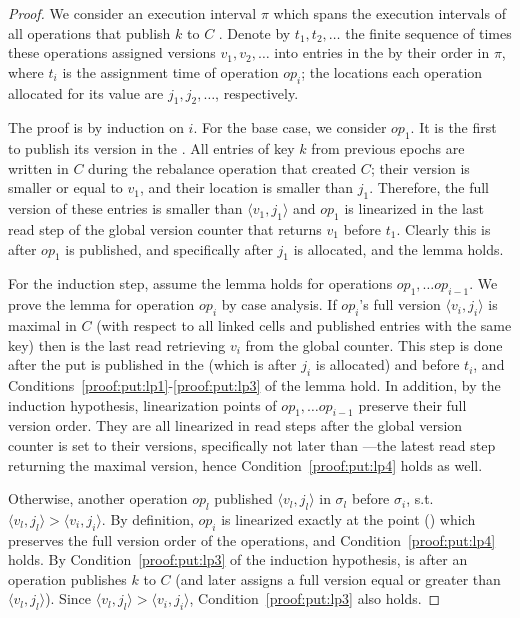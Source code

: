 \begin{proof}
We consider an execution interval $\pi$ which spans the execution intervals of all operations that publish $k$ to $C$ .
Denote by $t_1, t_2, \ldots $ the finite sequence of times these operations assigned versions $v_1, v_2, \ldots$ into entries in the  by their order in $\pi$, where $t_i$ is the assignment time of operation $op_i$; the locations each operation allocated for its value are $j_1, j_2, \ldots$, respectively.

The proof is by induction on $i$. For the base case, we consider $op_1$. It is the first to publish its version in the . 
All entries of key $k$ from previous epochs are written in $C$ during the rebalance operation that created $C$; their version is smaller or equal to $v_1$, and their location is smaller than $j_1$. 
Therefore, the full version of these entries is smaller than $\langle v_1, j_1\rangle$  and $op_1$ is linearized in the last read step of the global version counter that returns $v_1$ before $t_1$. Clearly this is after $op_1$ is published, and specifically after $j_1$ is allocated, and the lemma holds.

For the induction step, assume the lemma holds for operations $op_1, \ldots op_{i-1}$. We prove the lemma for operation $op_i$ by case analysis.
If $op_i$'s full version $\langle v_i, j_i\rangle$ is maximal in $C$ (with respect to all linked cells and published entries with the same key) then  is the last read retrieving $v_i$ from the global counter. This step is done after the put is published in the  (which is after $j_i$ is allocated) and before $t_i$, and Conditions~\ref{proof:put:lp1}-\ref{proof:put:lp3} of the lemma hold. In addition, by the induction hypothesis, linearization points of $op_1, \ldots op_{i-1}$ preserve their full version order. They are all linearized in read steps after the global version counter is set to their versions, specifically not later than ---the latest read step returning the maximal version, hence Condition~\ref{proof:put:lp4} holds as well.

Otherwise, another operation $op_l$ published $\langle v_l, j_l\rangle$ in $\sigma_l$ before $\sigma_i$, s.t. $\langle v_l, j_l\rangle > \langle v_i, j_i\rangle$. By definition, $op_i$ is linearized exactly at the point () which preserves the full version order of the operations, and Condition~\ref{proof:put:lp4} holds. By Condition~\ref{proof:put:lp3} of the induction hypothesis,  is after an operation publishes $k$ to $C$ (and later assigns a full version equal or greater than $\langle v_l, j_l\rangle$). Since $\langle v_l, j_l\rangle > \langle v_i, j_i\rangle$, Condition~\ref{proof:put:lp3} also holds. 


\end{proof}

